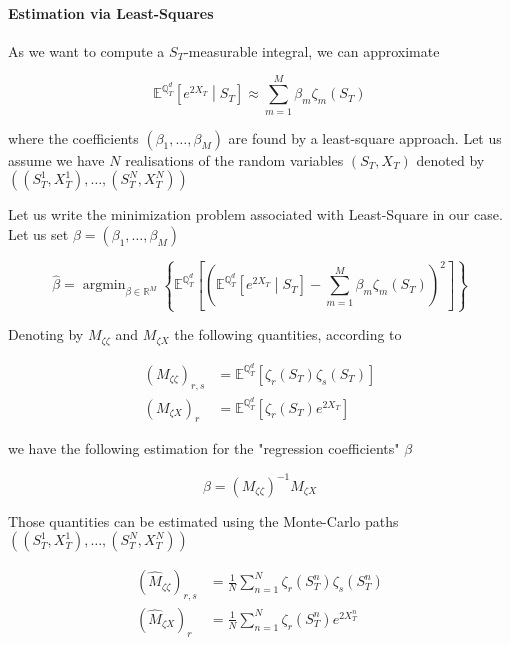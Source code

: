\documentclass{article}
\DeclareMathOperator*{\argmin}{argmin}
\begin{document}
\paragraph{Estimation via Least-Squares}
As we want to compute a $S_T$-measurable integral, we can approximate

\begin{equation}
	\mathbb{E}^{\mathbb{Q}_T^d}\left[e^{2X_T}\middle| S_T \right] \approx \sum_{m=1}^{M} \beta_m \zeta_m\left(S_T\right)
\end{equation}

\noindent where the coefficients $(\beta_1, \dots, \beta_M)$ are found by a least-square approach. Let us assume we have $N$ realisations of the random variables $(S_T,X_T)$ denoted by $\left((S_T^1,X_T^1),\dots, (S_T^N,X_T^N)\right)$

\noindent Let us write the minimization problem associated with Least-Square in our case. Let us set $\beta = \left(\beta_1, \dots, \beta_M\right)$

\begin{equation}
	\hat{\beta} = \argmin_{\beta \in \mathbb{R}^M}
\left\{\mathbb{E}^{\mathbb{Q}_T^d}\left[\left(\mathbb{E}^{\mathbb{Q}_T^d}\left[e^{2X_T} \middle| S_T\right] - \sum_{m=1}^M \beta_m \zeta_m\left(S_T\right)\right)^2\right]\right\}
\end{equation}

\noindent Denoting by $M_{\zeta \zeta}$ and $M_{\zeta X}$ the following quantities, according to \cite{Humeau2013}

\begin{equation}
\begin{aligned}
	(M_{\zeta \zeta})_{r,s} &= \mathbb{E}^{\mathbb{Q}_T^d}\left[\zeta_r(S_T)\zeta_s(S_T)\right]\\
	(M_{\zeta X})_r &= \mathbb{E}^{\mathbb{Q}_T^d}\left[\zeta_r(S_T)e^{2X_T}\right]
\end{aligned}
\end{equation}

\noindent we have the following estimation for the "regression coefficients" $\beta$

\begin{equation}	
	\beta = (M_{\zeta \zeta})^{-1} M_{\zeta X}
\end{equation}

\noindent Those quantities can be estimated using the Monte-Carlo paths $\left((S_T^1,X_T^1),\dots, (S_T^N,X_T^N)\right)$

\begin{equation}
\begin{aligned}
	(\hat{M}_{\zeta \zeta})_{r,s} &= \frac{1}{N} \sum_{n=1}^N \zeta_r(S_T^n)\zeta_s(S_T^n)\\
	(\hat{M}_{\zeta X})_r &= \frac{1}{N} \sum_{n=1}^N \zeta_r(S_T^n)e^{2X_T^n}
\end{aligned}
\end{equation}
\end{document}
